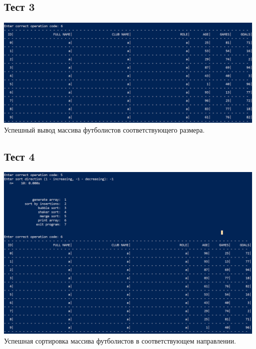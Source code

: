 \documentclass[12pt]{article}
\begin{document}
	\subsection{Тест 3}
	\includegraphics[width=1\linewidth]{test_3.png} \newline
	Успешный вывод массива футболистов соответствующего размера.
	
	\subsection{Тест 4}
	\includegraphics[width=1\linewidth]{test_4.png} \newline
	Успешная сортировка массива футболистов в соответствующем направлении.
	
\end{document}
